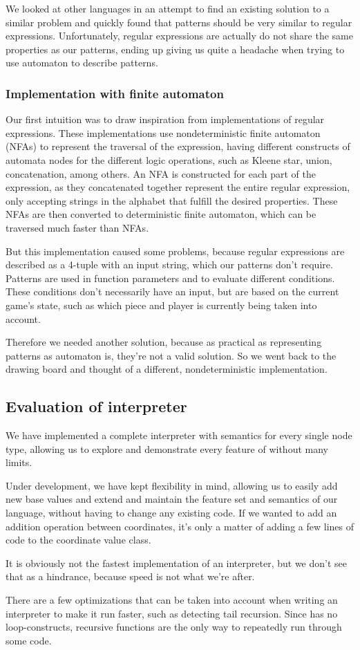We looked at other languages in an attempt to find an existing solution
to a similar problem and quickly found that patterns should be very
similar to regular expressions. Unfortunately, regular expressions are
actually do not share the same properties as our patterns, ending up
giving us quite a headache when trying to use automaton to describe
patterns.


\subsubsection{Implementation with finite automaton}
Our first intuition was to draw inspiration from implementations
of regular expressions. These implementations use nondeterministic
finite automaton (NFAs) to represent the traversal of the expression,
having different constructs of automata nodes for the different logic
operations, such as Kleene star, union, concatenation, among others. An
NFA is constructed for each part of the expression, as they concatenated
together represent the entire regular expression, only accepting strings
in the alphabet that fulfill the desired properties. These NFAs are then
converted to deterministic finite automaton, which can be traversed much
faster than NFAs.

But this implementation caused some problems, because regular
expressions are described as a 4-tuple with an input string, which our
patterns don't require. Patterns are used in function parameters and to
evaluate different conditions. These conditions don't necessarily have
an input, but are based on the current game's state, such as which piece
and player is currently being taken into account.

Therefore we needed another solution, because as practical as
representing patterns as automaton is, they're not a valid solution.
So we went back to the drawing board and thought of a different,
nondeterministic implementation.

\subsection{Evaluation of interpreter}
We have implemented a complete interpreter with semantics for every
single node type, allowing us to explore and demonstrate every feature
of \productname{} without many limits.

Under development, we have kept flexibility in mind, allowing us to
easily add new base values and extend and maintain the feature set and
semantics of our language, without having to change any existing code.
If we wanted to add an addition operation between coordinates, it's only
a matter of adding a few lines of code to the coordinate value class.

It is obviously not the fastest implementation of an interpreter, but we
don't see that as a hindrance, because speed is not what we're after.

There are a few optimizations that can be taken into account when
writing an interpreter to make it run faster, such as detecting tail
recursion. Since \productname{} has no loop-constructs, recursive
functions are the only way to repeatedly run through some code.

